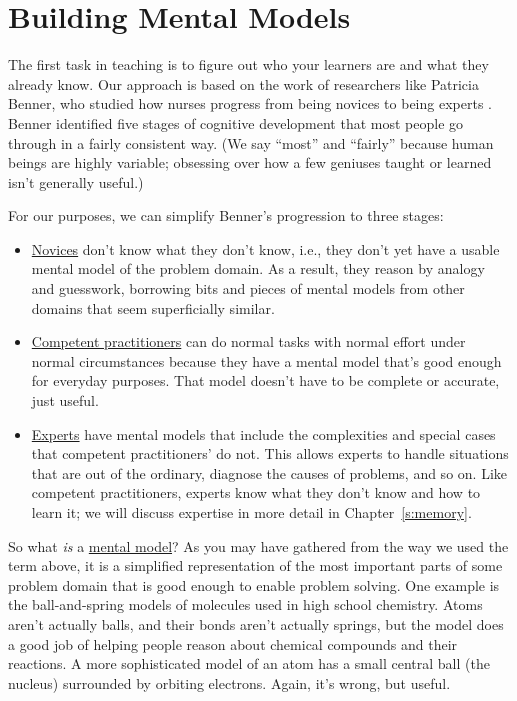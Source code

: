\chapter{Building Mental Models}\label{s:models}

The first task in teaching is to figure out who your learners are and
what they already know. Our approach is based on the work of researchers
like Patricia Benner, who studied how nurses progress from being novices
to being experts \cite{Benn2000}. Benner identified five stages of
cognitive development that most people go through in a fairly consistent
way. (We say ``most'' and ``fairly'' because human beings are highly
variable; obsessing over how a few geniuses taught or learned isn't
generally useful.)

For our purposes, we can simplify Benner's progression to three stages:

\begin{itemize}
\item
  \hyperlink{g:novice}{Novices}
  don't know what they don't know, i.e., they don't yet have a usable
  mental model of the problem domain. As a result, they reason by
  analogy and guesswork, borrowing bits and pieces of mental models
  from other domains that seem superficially similar.
\item
  \hyperlink{g:competent-practitioner}{Competent practitioners}
  can do normal tasks with normal effort under normal circumstances
  because they have a mental model that's good enough for everyday
  purposes. That model doesn't have to be complete or accurate, just
  useful.
\item
  \hyperlink{g:expert}{Experts}
  have mental models that include the complexities and special cases
  that competent practitioners' do not. This allows experts to handle
  situations that are out of the ordinary, diagnose the causes of
  problems, and so on. Like competent practitioners, experts know what
  they don't know and how to learn it; we will discuss expertise in
  more detail in Chapter~\ref{s:memory}.
\end{itemize}

So what \emph{is} a \hyperlink{g:mental-model}{mental model}? As you may
have gathered from the way we used the term above, it is a simplified
representation of the most important parts of some problem domain that
is good enough to enable problem solving. One example is the
ball-and-spring models of molecules used in high school chemistry. Atoms
aren't actually balls, and their bonds aren't actually springs, but the
model does a good job of helping people reason about chemical compounds
and their reactions. A more sophisticated model of an atom has a small
central ball (the nucleus) surrounded by orbiting electrons. Again, it's
wrong, but useful.

